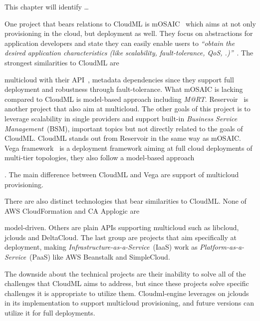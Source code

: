 
This chapter will identify \ldots


One project that bears relations to CloudML is mOSAIC~\cite{portable:petcu12} which
aims at not only provisioning in the cloud, but deployment as well.
They focus on abstractions for application developers and state they can easily enable users to
\emph{``obtain the desired application characteristics (like
scalability, fault-tolerance, QoS, \etc.)''}~\cite{architecturing:petcu11}.
The strongest similarities to CloudML are 
\begin{ii}\iitem multicloud with their API~\cite{architecturing:petcu11},
\iitem metadata dependencies since they support full deployment and
\iitem robustness through fault-tolerance.
What mOSAIC is lacking compared to CloudML is model-based approach including \emph{M@RT}.
Reservoir~\cite{reservoir:rochweger09} is another project that also aim at
\iitem multicloud. The other goals of this project is to leverage 
scalability in single providers and support built-in \emph{Business Service Management}~(BSM),
important topics but not directly related to the goals of CloudML.
CloudML stands out from Reservoir in the same way as mOSAIC.
Vega framework~\cite{simplifying:chieu10} is a deployment framework aiming 
at full cloud deployments of multi-tier topologies, they also follow a \iitem model-based 
approach\end{ii}. The main difference between CloudML and Vega are support of multicloud provisioning.

There are also distinct technologies that bear similarities to CloudML.
None of AWS CloudFormation and CA Applogic are \begin{ii}\iitem model-driven.
Others are plain APIs supporting \iitem multicloud such as libcloud, jclouds and DeltaCloud.
The last group are projects that aim specifically at deployment, 
making \emph{Infrastructure-as-a-Service}~(IaaS) work as \emph{Platform-as-a-Service}~(PaaS)
like AWS Beanstalk and SimpleCloud.\end{ii}
The downside about the technical projects are their inability to solve all of the challenges
that CloudML aims to address, but since these projects solve specific
challenges it is appropriate to utilize them.
Cloudml-engine leverages on jclouds in its implementation to support multicloud provisioning,
and future versions can utilize it for full deployments.

